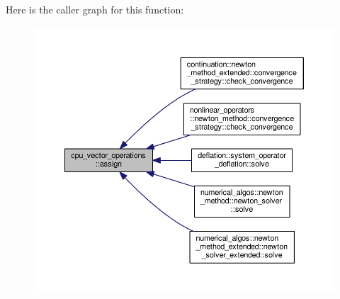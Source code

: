 Here is the caller graph for this function\-:\nopagebreak
\begin{figure}[H]
\begin{center}
\leavevmode
\includegraphics[width=350pt]{structcpu__vector__operations_aee016bc7ac6cc3a7149d3444e5b0ac57_icgraph}
\end{center}
\end{figure}


